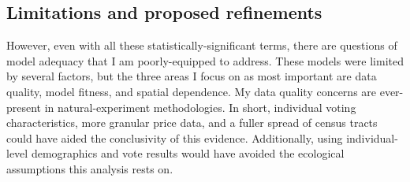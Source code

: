 \documentclass[12pt,oneside]{psthesis}
\begin{document}
\hypertarget{limitations}{%
\subsection{Limitations and proposed refinements}\label{limitations}}

However, even with all these statistically-significant terms, there are questions of model adequacy that I am poorly-equipped to address.
These models were limited by several factors, but the three areas I focus on as most important are data quality, model fitness, and spatial dependence.
My data quality concerns are ever-present in natural-experiment methodologies.
In short, individual voting characteristics, more granular price data, and a fuller spread of census tracts could have aided the conclusivity of this evidence.
Additionally, using individual-level demographics and vote results would have avoided the ecological assumptions this analysis rests on.
\end{document}
